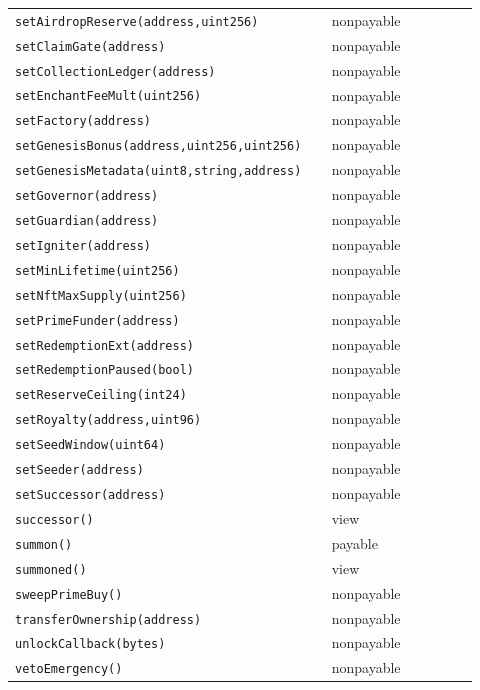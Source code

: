 \begin{longtable}{@{}p{0.62\linewidth}p{0.30\linewidth}@{}}
\texttt{\scriptsize setAirdropReserve(address,uint256)} & nonpayable \\
\texttt{\scriptsize setClaimGate(address)} & nonpayable \\
\texttt{\scriptsize setCollectionLedger(address)} & nonpayable \\
\texttt{\scriptsize setEnchantFeeMult(uint256)} & nonpayable \\
\texttt{\scriptsize setFactory(address)} & nonpayable \\
\texttt{\scriptsize setGenesisBonus(address,uint256,uint256)} & nonpayable \\
\texttt{\scriptsize setGenesisMetadata(uint8,string,address)} & nonpayable \\
\texttt{\scriptsize setGovernor(address)} & nonpayable \\
\texttt{\scriptsize setGuardian(address)} & nonpayable \\
\texttt{\scriptsize setIgniter(address)} & nonpayable \\
\texttt{\scriptsize setMinLifetime(uint256)} & nonpayable \\
\texttt{\scriptsize setNftMaxSupply(uint256)} & nonpayable \\
\texttt{\scriptsize setPrimeFunder(address)} & nonpayable \\
\texttt{\scriptsize setRedemptionExt(address)} & nonpayable \\
\texttt{\scriptsize setRedemptionPaused(bool)} & nonpayable \\
\texttt{\scriptsize setReserveCeiling(int24)} & nonpayable \\
\texttt{\scriptsize setRoyalty(address,uint96)} & nonpayable \\
\texttt{\scriptsize setSeedWindow(uint64)} & nonpayable \\
\texttt{\scriptsize setSeeder(address)} & nonpayable \\
\texttt{\scriptsize setSuccessor(address)} & nonpayable \\
\texttt{\scriptsize successor()} & view \\
\texttt{\scriptsize summon()} & payable \\
\texttt{\scriptsize summoned()} & view \\
\texttt{\scriptsize sweepPrimeBuy()} & nonpayable \\
\texttt{\scriptsize transferOwnership(address)} & nonpayable \\
\texttt{\scriptsize unlockCallback(bytes)} & nonpayable \\
\texttt{\scriptsize vetoEmergency()} & nonpayable \\
\bottomrule\end{longtable}

